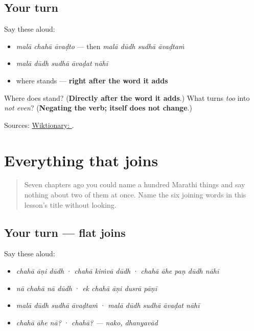 \subsection*{Your turn}
Say these aloud:

\begin{itemize}
\raggedright
  \item \emph{malā chahā āvaḍto} — then \emph{malā dūdh sudhā āvaḍtaṁ}
  \item \emph{malā dūdh sudhā āvaḍat nāhī}
  \item where \textbf{} stands — \textbf{right after the word it adds}
\end{itemize}

\begin{tcolorbox}[breakable,colback=teal!4,colframe=teal!35!black,title={Before you move on}]
Where does \textbf{} stand? (\textbf{Directly after the word it adds}.) What turns \emph{too} into \emph{not even}? (\textbf{Negating the verb;  itself does not change}.)

Sources: \href{https://en.wiktionary.org/wiki/\%E0\%A4\%B8\%E0\%A5\%81\%E0\%A4\%A6\%E0\%A5\%8D\%E0\%A4\%A7\%E0\%A4\%BE}{Wiktionary: }.
\end{tcolorbox}
\section[\texorpdfstring{\mr{आणि} · \mr{किंवा} · \mr{पण} … (āṇi · kiṁvā …)}{आणि · किंवा · पण … (āṇi · kiṁvā …)}]{Everything that joins}

\label{lesson:MR-R36-joined}



\begin{quote}
Seven chapters ago you could name a hundred Marathi things and say nothing about two of them at once. Name the six joining words in this lesson's title without looking.
\end{quote}

\subsection*{Your turn — flat joins}
Say these aloud:

\begin{itemize}
\raggedright
  \item \emph{chahā āṇi dūdh} · \emph{chahā kiṁvā dūdh} · \emph{chahā āhe paṇ dūdh nāhī}
  \item \emph{nā chahā nā dūdh} · \emph{ek chahā āṇi dusrā pāṇī}
  \item \emph{malā dūdh sudhā āvaḍtaṁ} · \emph{malā dūdh sudhā āvaḍat nāhī}
  \item \emph{chahā āhe nā?} · \emph{chahā? — nako, dhanyavād}
\end{itemize}

